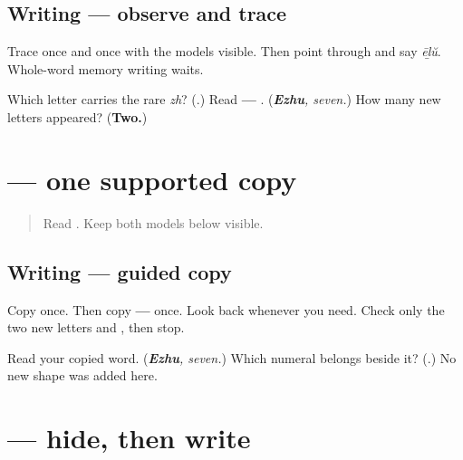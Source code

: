 \subsection*{Writing — observe and trace}

Trace \textbf{} once and \textbf{} once with the models visible. Then point through \textbf{} and say \emph{ēḻŭ}. Whole-word memory writing waits.

\begin{tcolorbox}[breakable,colback=teal!4,colframe=teal!35!black,title={Before you move on}]
Which letter carries the rare \emph{zh}? (\textbf{}.) Read \textbf{ — }. (\emph{\textbf{Ezhu}, seven.}) How many new letters appeared? (\textbf{Two.})
\end{tcolorbox}
\section[\texorpdfstring{\ml{൬} \ml{൭} \ml{൮} \ml{൯} \ml{൰} (six to ten)}{൬ ൭ ൮ ൯ ൰ (six to ten)}]{     — one supported copy}

\label{lesson:ML-W07-numbers-6-10-guided-copy}



\begin{quote}
Read \textbf{    }. Keep both models below visible.
\end{quote}

\subsection*{Writing — guided copy}
Copy \textbf{    } once. Then copy \textbf{ — } once. Look back whenever you need. Check only the two new letters \textbf{} and \textbf{}, then stop.

\begin{tcolorbox}[breakable,colback=teal!4,colframe=teal!35!black,title={Before you move on}]
Read your copied word. (\emph{\textbf{Ezhu}, seven.}) Which numeral belongs beside it? (\textbf{}.) No new shape was added here.
\end{tcolorbox}
\section[\texorpdfstring{\ml{ഏഴ്} \ml{൭} (ēḻŭ, seven)}{ഏഴ് ൭ (ēḻŭ, seven)}]{ — hide, then write}


